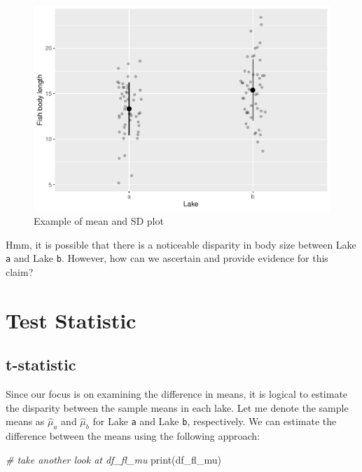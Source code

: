 \documentclass[
]{book}
\newenvironment{Shaded}{\begin{snugshade}}{\end{snugshade}}
\newcommand{\CommentTok}[1]{\textcolor[rgb]{0.56,0.35,0.01}{\textit{#1}}}
\newcommand{\FunctionTok}[1]{\textcolor[rgb]{0.00,0.00,0.00}{#1}}
\newcommand{\NormalTok}[1]{#1}
\begin{document}
\begin{figure}

{\centering \includegraphics{_main_files/figure-latex/mean-plot-1} 

}

\caption{Example of mean and SD plot}\label{fig:mean-plot}
\end{figure}

Hmm, it is possible that there is a noticeable disparity in body size between Lake \texttt{a} and Lake \texttt{b}. However, how can we ascertain and provide evidence for this claim?

\hypertarget{test-statistic}{%
\section{Test Statistic}\label{test-statistic}}

\hypertarget{t-statistic}{%
\subsection{t-statistic}\label{t-statistic}}

Since our focus is on examining the difference in means, it is logical to estimate the disparity between the sample means in each lake. Let me denote the sample means as \(\hat{\mu}_a\) and \(\hat{\mu}_b\) for Lake \texttt{a} and Lake \texttt{b}, respectively. We can estimate the difference between the means using the following approach:

\begin{Shaded}
\begin{Highlighting}[]
\CommentTok{\# take another look at df\_fl\_mu}
\FunctionTok{print}\NormalTok{(df\_fl\_mu)}
\end{Highlighting}
\end{Shaded}
\end{document}
